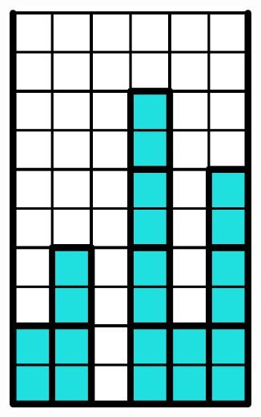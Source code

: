 \begin{figure}[ht]
  \centering
  \begin{subfigure}[b]{0.15\textwidth}
    \centering
    \includegraphics[width=0.9\textwidth]{pictures/dominoes/vertical_configuration.pdf}
    \caption{}
  \end{subfigure}
  \begin{subfigure}[b]{0.15\textwidth}
    \centering

\end{subfigure}
\end{figure}
